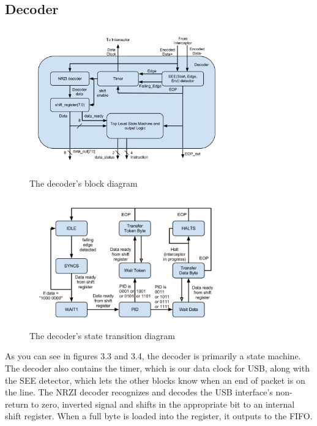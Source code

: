 \documentclass[12pt,letter,oneside]{report}
\begin{document}
\subsection{Decoder}
\begin{figure}[h!]
		\centering
		\caption{The decoder's block diagram}
		\includegraphics[width=0.75\textwidth]{decoderBlock}
\end{figure}
\begin{figure}[h!]
		\centering
		\caption{The decoder's state transition diagram}
		\includegraphics[width=0.75\textwidth]{decoderTrans}
\end{figure}
As you can see in figures 3.3 and 3.4, the decoder is primarily a state machine. The decoder also contains the timer, which is our data clock for USB, along with the SEE detector, which lets the other blocks know when an end of packet is on the line. The NRZI decoder recognizes and decodes the USB interface's non-return to zero, inverted signal and shifts in the appropriate bit to an internal shift register. When a full byte is loaded into the register, it outputs to the FIFO.
\end{document}
